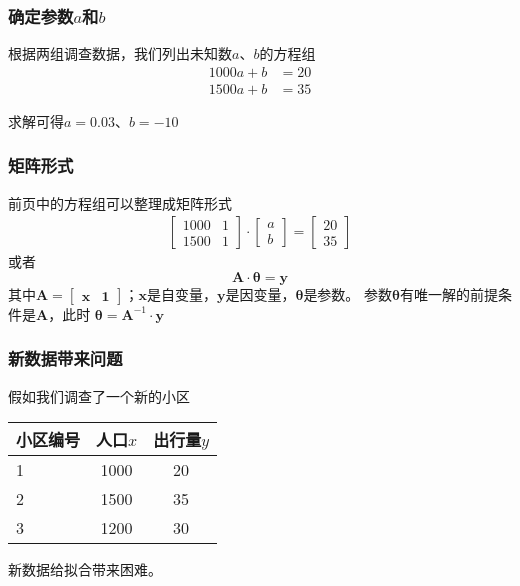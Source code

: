 \documentclass[14pt]{beamer}
\newcommand{\mat}[1]{\bm{#1}}
\renewcommand{\vec}[1]{\bm{#1}}
\newcommand{\MA}{\mat{A}}
\newcommand{\Vy}{\vec{y}}
\newcommand{\Vx}{\vec{x}}
\newcommand{\Vt}{\vec{\theta}}
\let\emph\relax %
\begin{document}
\begin{frame}
    \frametitle{确定参数$a$和$b$}
    根据两组调查数据，我们列出未知数$a$、$b$的方程组
    \begin{align*}
        1000a+b&=20\\
        1500a+b&=35
    \end{align*}

    求解可得$a=0.03$、$b=-10$
\end{frame}

\begin{frame}
    \frametitle{矩阵形式}
    前页中的方程组可以整理成矩阵形式
    \begin{align*}
        \begin{bmatrix}
            1000 & 1\\
            1500 & 1
        \end{bmatrix}\cdot
        \begin{bmatrix}
            a \\
            b
        \end{bmatrix}=
        \begin{bmatrix}
            20\\
            35
        \end{bmatrix}
    \end{align*}
    或者
    \[\MA\cdot \vec{\theta}=\Vy\]
    其中$\MA=\begin{bmatrix}
        \Vx & \vec{1}
    \end{bmatrix}$；$\Vx$是自变量，$\Vy$是因变量，$\Vt$是参数。
    参数$\Vt$有唯一解的前提条件是$\MA$\emph{可逆}，此时
    $\vec{\theta}= \MA^{-1}\cdot\Vy$
\end{frame}

\begin{frame}
    \frametitle{新数据带来问题}
    假如我们调查了一个新的小区
    \begin{table}
        \begin{tabular}{l c c}
            小区编号 & 人口$x$ & 出行量$y$ \\
            \hline\hline
            1   & 1000  & 20 \\
            2   & 1500  & 35 \\
            \rowcolor{HRed} 3 & 1200 & 30      
        \end{tabular}
    \end{table}

    新数据给拟合带来困难。
\end{frame}
\end{document}
